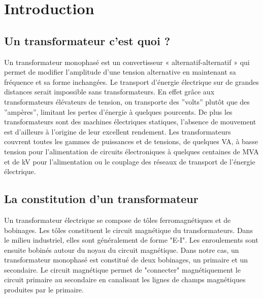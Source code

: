 \section{Introduction}


\subsection{Un transformateur c'est quoi ? }
	
	Un transformateur monophasé est un convertisseur « alternatif-alternatif » qui permet de modifier l'amplitude d'une tension alternative en maintenant sa fréquence et sa forme inchangées. Le transport d'énergie électrique sur de grandes distances serait impossible sans transformateurs. En effet grâce aux transformateurs élévateurs de tension, on transporte des ''volts'' plutôt que des ''ampères'', limitant les pertes d'énergie à quelques pourcents. De plus les transformateurs sont des machines électriques statiques, l'absence de mouvement est d'ailleurs à l'origine de leur excellent rendement. Les transformateurs couvrent toutes les gammes de puissances et de tensions, de quelques VA, à basse tension pour l'alimentation de circuits électroniques à quelques centaines de MVA et de kV pour l'alimentation ou le couplage des réseaux de transport de l'énergie électrique. 
	

\subsection{La constitution d'un transformateur}
	
	Un transformateur électrique se compose de tôles ferromagnétiques et de bobinages. Les tôles constituent le circuit magnétique du transformateurs. Dans le milieu industriel, elles sont généralement de forme "E-I". %
 Les enroulements sont ensuite bobinés autour du noyau du circuit magnétique. Dans notre cas, un transformateur monophasé est constitué de deux bobinages, un primaire et un secondaire. 
Le circuit magnétique permet de "connecter"  magnétiquement le circuit primaire au secondaire en canalisant les lignes de champs magnétiques produites par le primaire.

